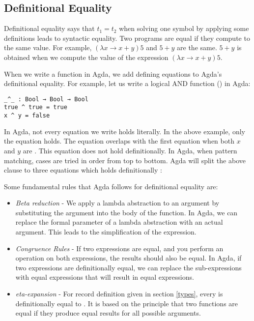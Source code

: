 \subsection{Definitional Equality}
Definitional equality says that $t_1 = t_2$ when solving one symbol by applying
some definitions leads to syntactic equality. Two programs are equal if they
compute to the same value. For example, $(\lambda x \rightarrow x + y) 5$ and $5
+ y$ are the same. $5 + y$ is obtained when we compute the value of the
expression $ (\lambda x \rightarrow x + y) 5$.

When we write a function in Agda, we add defining equations to Agda's
definitional equality. For example, let us write a logical AND function
(\inline{_^_}) in Agda:

\begin{verbatim}
_^_ : Bool → Bool → Bool
true ^ true = true
x ^ y = false
\end{verbatim}

In Agda, not every equation we write holds literally. In the above example,
only the equation  holds. The equation  overlaps with the first equation when both $x$ and $y$ are
. This equation does not hold definitionally. In Agda, when pattern
matching, cases are tried in order from top to bottom. Agda will split the above
clause to three equations which holds definitionally \cite{abel2012agda}:
\begin{description}
  \item[] 
  \item[] 
  \item[] 
\end{description}

Some fundamental rules that Agda follows for definitional equality are: 
\begin{itemize}
  \item \emph{Beta reduction} - We apply a lambda abstraction to an argument by
  substituting the argument into the body of the function. In Agda, we can
  replace the formal parameter of a lambda abstraction with an actual argument.
  This leads to the simplification of the expression.
  \item \emph{Congruence Rules} - If two expressions are equal, and you perform
  an operation on both expressions, the results should also be equal. In
  Agda, if two expressions are definitionally equal, we can replace the
  sub-expressions with equal expressions that will result in equal expressions.
  \item \emph{eta-expansion} - For record definition  given in
  section \ref{types}, every  is definitionally equal to
  . It is based on
  the principle that two functions are equal if they produce equal results for
  all possible arguments. 
\end{itemize}

